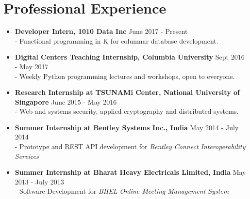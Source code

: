\documentclass{article}
\begin{document}
\section*{Professional Experience}
\begin{itemize}
    \item \textbf{Developer Intern, 1010 Data Inc} {\hfill June 2017 - Present}\\
    - Functional programming in K for columnar database development.

    \item \textbf{Digital Centers Teaching Internship, Columbia University} {\hfill Sept 2016 - May 2017}\\
    - Weekly Python programming lectures and workshops, open to everyone.

    \item \textbf{Research Internship at TSUNAMi Center, National University of Singapore} {\hfill June 2015 - May 2016}\\
    - Web and systems security, applied cryptography and distributed systems.
    
    \item \textbf{Summer Internship at Bentley Systems Inc., India} {\hfill May 2014 - July 2014}\\
    - Prototype and REST API development for \textit{Bentley Connect Interoperability Services}

    \item \textbf{Summer Internship at Bharat Heavy Electricals Limited, India} {\hfill May 2013 - July 2013}\\
    - Software Development for \textit{BHEL Online Meeting Management System}
\end{itemize}
\end{document}
